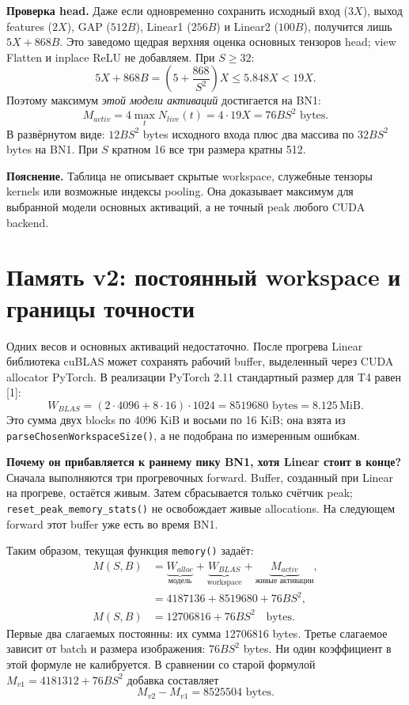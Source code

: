 \documentclass[11pt,a4paper]{article}
\newcommand{\bytes}{\text{ bytes}}
\newcommand{\page}[1]{\clearpage\section{#1}}
\newcommand{\note}[1]{\par\textbf{Пояснение.} #1\par}
\begin{document}
\textbf{Проверка head.} Даже если одновременно сохранить исходный вход
($3X$), выход features ($2X$), GAP ($512B$), Linear1 ($256B$)
и Linear2 ($100B$), получится лишь $5X+868B$.
Это заведомо щедрая верхняя оценка основных тензоров head; view Flatten
и inplace ReLU не добавляем. При $S\ge32$:
\[
 5X+868B=\left(5+\frac{868}{S^2}\right)X\le5.848X<19X.
\]
Поэтому максимум \emph{этой модели активаций} достигается на BN1:
\[
 M_{activ}=4\max_t N_{live}(t)=4\cdot19X=76BS^2\bytes.
\]
В развёрнутом виде: $12BS^2$ bytes исходного входа плюс два массива по
$32BS^2$ bytes на BN1. При $S$ кратном 16 все три размера кратны 512.

\note{Таблица не описывает скрытые workspace, служебные тензоры kernels
или возможные индексы pooling. Она доказывает максимум для выбранной
модели основных активаций, а не точный peak любого CUDA backend.}

\page{Память v2: постоянный workspace и границы точности}
Одних весов и основных активаций недостаточно. После прогрева Linear
библиотека cuBLAS может сохранять рабочий buffer, выделенный через CUDA
allocator PyTorch. В реализации PyTorch 2.11 стандартный размер для T4
равен [1]:
\[
 W_{BLAS}=(2\cdot4096+8\cdot16)\cdot1024
          =8519680\bytes=8.125\,\mathrm{MiB}.
\]
Это сумма двух blocks по 4096 KiB и восьми по 16 KiB; она взята из
\texttt{parseChosenWorkspaceSize()}, а не подобрана по измеренным ошибкам.

\textbf{Почему он прибавляется к раннему пику BN1, хотя Linear стоит в конце?}
Сначала выполняются три прогревочных forward. Buffer, созданный при Linear
на прогреве, остаётся живым. Затем сбрасывается только счётчик peak;
\texttt{reset\_peak\_memory\_stats()} не освобождает живые allocations.
На следующем forward этот buffer уже есть во время BN1.

Таким образом, текущая функция \texttt{memory()} задаёт:
\begin{align*}
 M(S,B)&=\underbrace{W_{alloc}}_{\text{модель}}+\underbrace{W_{BLAS}}_{\text{workspace}}+\underbrace{M_{activ}}_{\text{живые активации}},\\
       &=4187136+8519680+76BS^2,\\
 \boxed{M(S,B)}&\boxed{=12706816+76BS^2\quad\text{bytes}.}
\end{align*}
Первые два слагаемых постоянны: их сумма $12706816$ bytes. Третье
слагаемое зависит от batch и размера изображения: $76BS^2$ bytes.
Ни один коэффициент в этой формуле не калибруется. В сравнении со старой
формулой $M_{v1}=4181312+76BS^2$ добавка составляет
\[
 M_{v2}-M_{v1}=8525504\bytes.
\]
\end{document}
